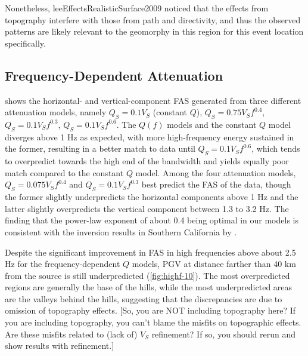 Nonetheless, {leeEffectsRealisticSurface2009} noticed that the effects from topography interfere with those from path and directivity, and thus the observed patterns are likely relevant to the geomorphy in this region for this event location specifically.


\subsection{Frequency-Dependent Attenuation}
 shows the horizontal- and vertical-component FAS generated from three different attenuation models, namely $Q_S=0.1V_S$ (constant $Q$), $Q_S=0.75V_Sf^{0.4}$, $Q_S=0.1V_Sf^{0.3}$, $Q_S=0.1V_Sf^{0.6}$. The $Q(f)$ models and the constant $Q$ model diverges above 1 Hz as expected, with more high-frequency energy sustained in the former, resulting in a better match to data until $Q_S=0.1V_Sf^{0.6}$, which tends to overpredict towards the high end of the bandwidth and yields equally poor match compared to the constant $Q$ model. Among the four attenuation models, $Q_S=0.075V_Sf^{0.4}$ and $Q_S=0.1V_Sf^{0.3}$ best predict the FAS of the data, though the former slightly underpredicts the horizontal components above 1 Hz and the latter slightly overpredicts the vertical component between 1.3 to 3.2 Hz. The finding that the power-law exponent of about 0.4 being optimal in our models is consistent with the inversion results in Southern California by \citet{linFrequencyDependentAttenuationWaves2018}.

Despite the significant improvement in FAS in high frequencies above about 2.5 Hz for the frequency-dependent $Q$ models, PGV at distance farther than 40 km from the source is still underpredicted (\cref{fig:highf-10}). The most overpredicted regions are generally the base of the hills, while the most underpredicted areas are the valleys behind the hills, suggesting that the discrepancies are due to omission of topography effects. [So, you are NOT including topography here? If you are including topography, you can’t blame the misfits on topographic effects. Are these misfits related to (lack of) $V_S$ refinement? If so, you should rerun and show results with refinement.]

